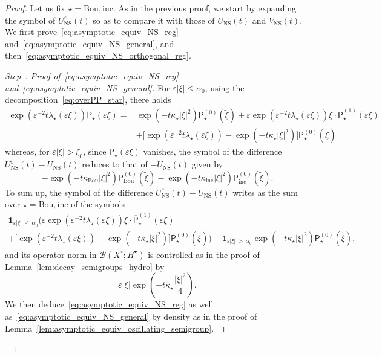 \documentclass[10pt]{amsart}
\theoremstyle{definition}\newtheorem{defi}[theo]{Definition}\newtheorem{rema}[theo]{Remark}\newtheorem{exam}[theo]{Example}\newtheorem{exem}[theo]{Example}\newtheorem{nota}[theo]{Notation}
\newcommand{\ns}{\mathrm{NS}}
\newcommand{\Inc}{\mathrm{inc}}
\newcommand{\Bou}{\mathrm{Bou}}
\newcommand{\Burin}{\mathbf{1}}
\newcommand{\PP}{\mathsf{P}}
\newcommand{\BBB}{\mathscr{B}}
\newcommand{\Ssp}{H^{\bullet}}
\newcommand{\Slm}{X^{\circ}}
\renewcommand*\le{\leqslant}
\newcommand*\eps{{\varepsilon}}
\newcounter{stepcount}
\newenvironment{step}[1]{\refstepcounter{stepcount}\begin{proof}[Step~\thestepcount: #1]}{\let\qed\relax\end{proof}}
\begin{document}
\begin{proof}
Let us fix $\star=\Bou,\Inc$. As in the previous proof, we start by expanding the symbol of $U^\eps_\ns(t)$ so as to compare it with those of $U_\ns(t)$ and $V_\ns(t)$. We first prove~\eqref{eq:asymptotic_equiv_NS_reg} and~\eqref{eq:asymptotic_equiv_NS_general}, and then~\eqref{eq:asymptotic_equiv_NS_orthogonal_reg}.

\setcounter{stepcount}{0}
\begin{step}{{Proof of~\eqref{eq:asymptotic_equiv_NS_reg} and~\eqref{eq:asymptotic_equiv_NS_general}}}\label{prflemm4.4step1}
For $\eps | \xi | \le \alpha_0$, using the decomposition~\eqref{eq:overPP_star}, there holds
\begin{align*}
\exp\left(\eps^{-2} t \lambda_\star(\eps \xi) \right) \PP_\star(\eps \xi) = & \exp\left(- t \kappa_\star | \xi |^2 \right) \PP_\star^{(0)}\left(\widetilde{\xi} \right) + \eps \exp\left(\eps^{-2} t \lambda_\star(\eps \xi) \right)\xi \cdot \overline{\PP}_\star^{(1)}(\eps \xi) \\
& + \Big[\exp\left(\eps^{-2} t \lambda_\star(\eps \xi) \right) - \exp\left(- t \kappa_\star | \xi |^2 \right) \Big] \PP^{(0)}_\star\left(\widetilde{\xi} \right)
\end{align*}
whereas, for $\eps | \xi| > \xi_0$, since $\PP_\star(\eps \xi)$ vanishes, the symbol of the difference $U^\eps_\ns(t) - U_\ns(t)$ reduces to that of $-U_\ns(t)$ given by
\[
-\exp\left(- t \kappa_\Bou | \xi |^2 \right) \PP_\Bou^{(0)}\left(\widetilde{\xi} \right) - \exp\left(-t\kappa_{\Inc}|\xi|^{2}\right)\PP_{\Inc}^{(0)}\left(\widetilde{\xi}\right).
\]
To sum up, the symbol of the difference $U_\ns^\eps(t) - U_\ns (t)$ writes as the sum over $\star=\Bou,\Inc$ of the symbols
\begin{multline*}
\Burin_{\eps | \xi |\,\le\,\alpha_0} \Big(\eps \exp\left(\eps^{-2} t \lambda_\star(\eps \xi) \right)\xi \cdot \overline{\PP}_\star^{(1)}(\eps \xi) \\ + \Big[\exp\left(\eps^{-2} t \lambda_\star(\eps \xi) \right) - \exp\left(- t \kappa_\star | \xi |^2 \right) \Big] \PP^{(0)}_\star\left(\widetilde{\xi} \right) \Big) 
- \Burin_{\eps | \xi |\,>\,\alpha_0} \exp\left(- t \kappa_\star | \xi |^2 \right) \PP_\star^{(0)}\left(\widetilde{\xi} \right),
\end{multline*}
and its operator norm in $\BBB(\Slm ; \Ssp)$ is controlled as in the proof of Lemma~\ref{lem:decay_semigroups_hydro} by
\[
\eps | \xi | \exp\left(- t \kappa_\star \frac{| \xi |^2}{4} \right).
\]
We then deduce~\eqref{eq:asymptotic_equiv_NS_reg} as well as~\eqref{eq:asymptotic_equiv_NS_general} by density as in the proof of Lemma~\ref{lem:asymptotic_equiv_oscillating_semigroup}.

\end{step}
\end{proof}
\end{document}

